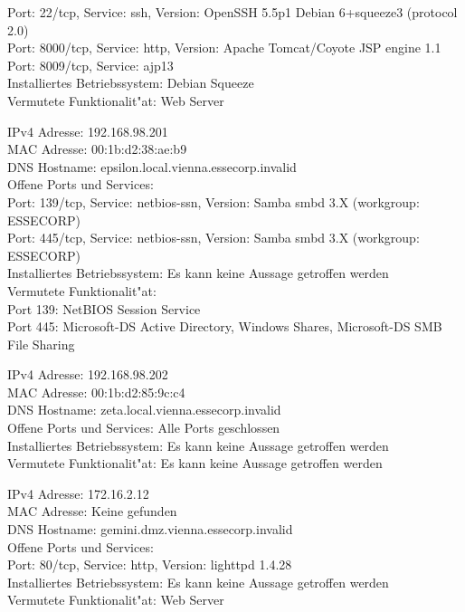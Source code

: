 \documentclass[12pt,a4paper,titlepage,oneside]{scrartcl}
\begin{document}
\begin{description}
Port: 22/tcp, Service: ssh, Version: OpenSSH 5.5p1 Debian 6+squeeze3 (protocol 2.0)\\
Port: 8000/tcp, Service: http, Version: Apache Tomcat/Coyote JSP engine 1.1\\
Port: 8009/tcp, Service: ajp13\\
Installiertes Betriebssystem: Debian Squeeze\\
Vermutete Funktionalit"at: Web Server\\
\item
IPv4 Adresse: 192.168.98.201\\
MAC Adresse: 00:1b:d2:38:ae:b9\\
DNS Hostname: epsilon.local.vienna.essecorp.invalid\\
Offene Ports und Services:\\
Port: 139/tcp, Service: netbios-ssn, Version: Samba smbd 3.X (workgroup: ESSECORP)\\
Port: 445/tcp, Service: netbios-ssn, Version: Samba smbd 3.X (workgroup: ESSECORP)\\
Installiertes Betriebssystem: Es kann keine Aussage getroffen werden\\
Vermutete Funktionalit"at:\\
Port 139: NetBIOS Session Service\\
Port 445: Microsoft-DS Active Directory, Windows Shares, Microsoft-DS SMB File Sharing
\item
IPv4 Adresse: 192.168.98.202\\
MAC Adresse: 00:1b:d2:85:9c:c4\\
DNS Hostname: zeta.local.vienna.essecorp.invalid\\
Offene Ports und Services: Alle Ports geschlossen\\
Installiertes Betriebssystem: Es kann keine Aussage getroffen werden\\
Vermutete Funktionalit"at: Es kann keine Aussage getroffen werden\\
\item
IPv4 Adresse: 172.16.2.12\\
MAC Adresse: Keine gefunden\\
DNS Hostname: gemini.dmz.vienna.essecorp.invalid\\
Offene Ports und Services:\\
Port: 80/tcp, Service: http, Version: lighttpd 1.4.28\\
Installiertes Betriebssystem: Es kann keine Aussage getroffen werden\\
Vermutete Funktionalit"at: Web Server\\

\end{description}
\end{document}

